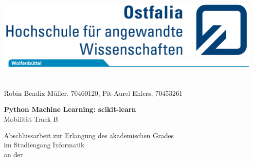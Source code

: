 % 
%
\begin{titlepage}
	\vspace*{-3.0cm}
	\hspace*{ 6.90cm}\includegraphics[scale=0.93]{../ostfalia/Ostfalia_LS_RGB_klein.jpg}\\
	\hspace*{-1.00cm}\includegraphics[scale=1.20]{../ostfalia/Reiter_Wolfen_RGB_174mm.jpg}\\
	
	\\
	
	\hrulefill\\
	
	{\Large\textsf{Robin Bendix Müller, 70460120, Pit-Aurel Ehlers, 70453261\\}}
	
	
	
	\vspace{2em}
	\textbf{
	\textsf{\LARGE Python Machine Learning: scikit-learn \\[0.3ex]}}
	\textsf{\hspace*{0.5cm}\large Mobilität Track B \\[0.05cm]}
	
	\vspace{2em}
	\begin{center}
	\ifdefined\graduation%
	\if\graduation\empty%
	\else%
	\textsf{Abschlussarbeit zur Erlangung des akademischen Grades}\\[0.5cm]
	\textsf{\graduation} \textsf{im Studiengang Informatik}\\[0.5cm]
	\textsf{an der \institution}\\[0.5cm]
	\textsf{\subinstitution}
	\fi
	\end{center}
	

\end{titlepage}
